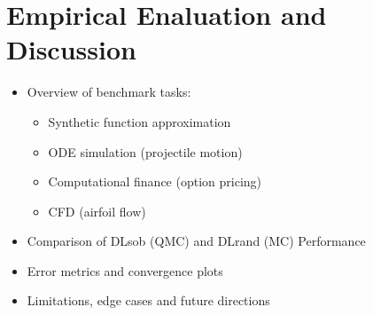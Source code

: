 \chapter{Empirical Enaluation and Discussion}
\label{chapter7}

\begin{itemize}
    \item Overview of benchmark tasks:
    \begin{itemize}
        \item Synthetic function approximation
        \item ODE simulation (projectile motion)
        \item Computational finance (option pricing)
        \item CFD (airfoil flow)
    \end{itemize}
    \item Comparison of DLsob (QMC) and DLrand (MC) Performance
    \item Error metrics and convergence plots
    \item Limitations, edge cases and future directions
\end{itemize}